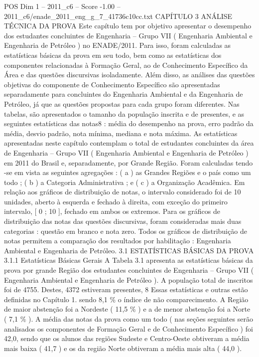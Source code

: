\begin{textsample}{POS Dim 1 – 2011\_c6 – Score -1.00 – 2011\_c6/enade\_2011\_eng\_g\_7\_41736c10cc.txt}  \label{ex:f1_pos_212}
CAPÍTULO 3 ANÁLISE TÉCNICA DA PROVA Este capítulo tem por objetivo apresentar o desempenho dos estudantes concluintes de Engenharia – Grupo VII ( Engenharia Ambiental e Engenharia de Petróleo ) no ENADE/2011.
Para isso, foram calculadas as estatísticas básicas da prova em seu todo, bem como as estatísticas dos componentes relacionadas à Formação Geral, ao de Conhecimento Específico da Área e das questões discursivas isoladamente.
Além disso, as análises das questões objetivas do componente de Conhecimento Específico são apresentadas separadamente para concluintes do Engenharia Ambiental e da Engenharia de Petróleo, já que as questões propostas para cada grupo foram diferentes.
Nas tabelas, são apresentados o tamanho da população inscrita e de presentes, e as seguintes estatísticas das notas8 : média do desempenho na prova, erro padrão da média, desvio padrão, nota mínima, mediana e nota máxima.
As estatísticas apresentadas neste capítulo contemplam o total de estudantes concluintes da área de Engenharia – Grupo VII ( Engenharia Ambiental e Engenharia de Petróleo ) em 2011 do Brasil e, separadamente, por Grande Região.
Foram calculadas tendo -se em vista as seguintes agregações : ( a ) as Grandes Regiões e o país como um todo ; ( b ) a Categoria Administrativa ; e ( c ) a Organização Acadêmica.
Em relação aos gráficos de distribuição de notas, o intervalo considerado foi de 10 unidades, aberto à esquerda e fechado à direita, com exceção do primeiro intervalo, [ 0 ; 10 ], fechado em ambos os extremos.
Para os gráficos de distribuição das notas das questões discursivas, foram consideradas mais duas categorias : questão em branco e nota zero.
Todos os gráficos de distribuição de notas permitem a comparação dos resultados por habilitação : Engenharia Ambiental e Engenharia de Petróleo. 3.1 ESTATÍSTICAS BÁSICAS DA PROVA 3.1.1 Estatísticas Básicas Gerais A Tabela 3.1 apresenta as estatísticas básicas da prova por grande Região dos estudantes concluintes de Engenharia – Grupo VII ( Engenharia Ambiental e Engenharia de Petróleo ).
A população total de inscritos foi de 4755.
Destes, 4372 estiveram presentes, 8 Essas estatísticas e outras estão definidas no Capítulo 1. sendo 8,1 \% o índice de não comparecimento.
A Região de maior abstenção foi a Nordeste ( 11,5 \% ) e a de menor abstenção foi a Norte ( 7,1 \% ).
A média das notas da prova como um todo ( nas seções seguintes serão analisados os componentes de Formação Geral e de Conhecimento Específico ) foi 42,0, sendo que os alunos das regiões Sudeste e Centro-Oeste obtiveram a média mais baixa ( 41,7 ) e os da região Norte obtiveram a média mais alta ( 44,0 ).

\end{textsample}
